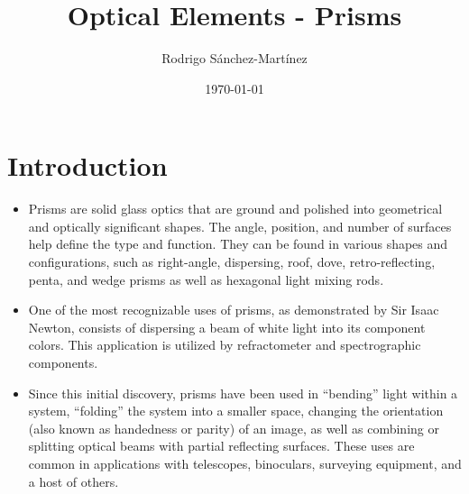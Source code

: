 \documentclass[11pt]{article}
\title{\textbf{Optical Elements - Prisms}}
\author{Rodrigo Sánchez-Martínez}
\date{\today}
\numberwithin{enumi}{section}
\begin{document}
	
\maketitle	
	
\tableofcontents

\section*{Introduction}

	\begin{itemize}
	
	\item 
	Prisms are solid glass optics that are ground and polished into geometrical and optically significant shapes.
	The angle, position, and number of surfaces help define the type and function.
	They can be found in various shapes and configurations, such as right-angle, dispersing, roof, dove, retro-reflecting, penta, and wedge prisms as well as hexagonal light mixing rods.
	
	\item
	One of the most recognizable uses of prisms, as demonstrated by Sir Isaac Newton, consists of dispersing a beam of white light into its component colors.
	This application is utilized by refractometer and spectrographic components.
	
	\item
	Since this initial discovery, prisms have been used in \enquote{bending} light within a system, \enquote{folding} the system into a smaller space, changing the orientation (also known as handedness or parity) of an image, as well as combining or splitting optical beams with partial reflecting surfaces.
	These uses are common in applications with telescopes, binoculars, surveying equipment, and a host of others.

	\end{itemize}
	
\section{}
\end{document}
